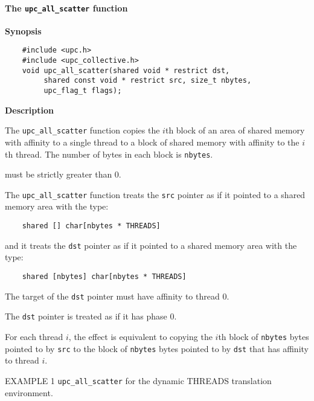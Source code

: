 \paragraph{The {\tt upc\_all\_scatter} function}

{\bf Synopsis} 

\npf\vspace{-2.5em}
\begin{verbatim}
    #include <upc.h>
    #include <upc_collective.h>
    void upc_all_scatter(shared void * restrict dst, 
         shared const void * restrict src, size_t nbytes, 
         upc_flag_t flags);
\end{verbatim}

{\bf Description} 

\np The {\tt upc\_all\_scatter} function copies the $i$th block of an
area of shared memory with affinity to a single thread
to a block of shared memory with affinity to the $i$th thread.
The number of bytes in each block is {\tt nbytes}.

 must be strictly greater than 0.

\np The {\tt upc\_all\_scatter} function treats the {\tt src} pointer
as if it pointed to a shared memory area with the type:

\begin{verbatim}
    shared [] char[nbytes * THREADS]
\end{verbatim}  

\np and it treats the {\tt dst} pointer as if it pointed to a shared
memory area with the type:

\begin{verbatim}
    shared [nbytes] char[nbytes * THREADS]
\end{verbatim}  

\np The target of the {\tt dst} pointer must have affinity to thread 0.

\np The {\tt dst} pointer is treated as if it has phase 0.

\np For each thread $i$, the effect is equivalent to copying
the $i$th block of {\tt nbytes} bytes pointed to by {\tt src} to
the block of {\tt nbytes} bytes 
pointed to by {\tt dst} that has affinity to thread $i$.

\np EXAMPLE 1 {\tt upc\_all\_scatter} for the {dynamic THREADS} translation
environment.


